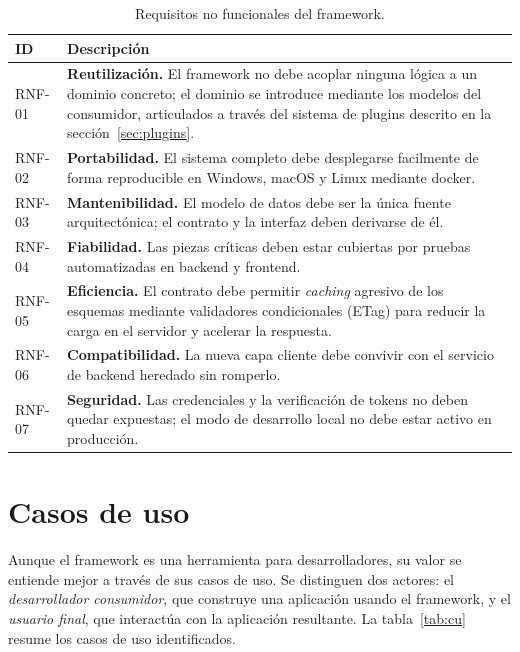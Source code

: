 \begin{table}[!htbp]
\caption{Requisitos no funcionales del framework.}
\label{tab:rnf}
\centering
\begin{tabular}{|l|p{9cm}|}
\hline
\textbf{ID} & \textbf{Descripción} \\ \hline
RNF-01 & \textbf{Reutilización.} El framework no debe acoplar ninguna lógica
a un dominio concreto; el dominio se introduce mediante los modelos del
consumidor, articulados a través del sistema de plugins descrito en la
sección~\ref{sec:plugins}. \\ \hline
RNF-02 & \textbf{Portabilidad.} El sistema completo debe desplegarse facilmente de forma
reproducible en Windows, macOS y Linux mediante \gls{docker}. \\ \hline
RNF-03 & \textbf{Mantenibilidad.} El modelo de datos debe ser la única fuente
arquitectónica; el contrato y la interfaz deben derivarse de él. \\ \hline
RNF-04 & \textbf{Fiabilidad.} Las piezas críticas deben estar cubiertas por
pruebas automatizadas en backend y frontend. \\ \hline
RNF-05 & \textbf{Eficiencia.} El contrato debe permitir \emph{caching}
agresivo de los esquemas mediante validadores condicionales (ETag) para reducir 
la carga en el servidor y acelerar la respuesta. \\ \hline
RNF-06 & \textbf{Compatibilidad.} La nueva capa cliente debe convivir con el
servicio de backend heredado sin romperlo. \\ \hline
RNF-07 & \textbf{Seguridad.} Las credenciales y la verificación de tokens no
deben quedar expuestas; el modo de desarrollo local no debe estar activo en
producción. \\ \hline
\end{tabular}
\end{table}

\section{Casos de uso}
Aunque el framework es una herramienta para desarrolladores, su valor se
entiende mejor a través de sus casos de uso. Se distinguen dos
actores: el \emph{desarrollador consumidor}, que construye una aplicación
usando el framework, y el \emph{usuario final}, que interactúa con la
aplicación resultante. La tabla~\ref{tab:cu} resume los casos de uso identificados.


